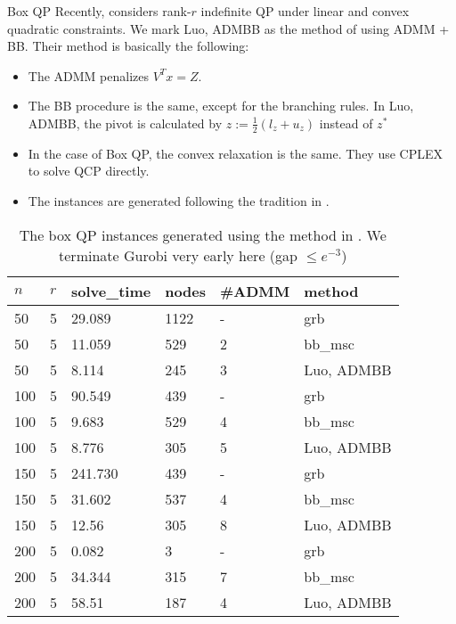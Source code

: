 \documentclass[aspectratio=1610, 9pt]{beamer}
\begin{document}
\setlength\pdfpagewidth{16.00cm}%
\setlength\pdfpageheight{20.00cm}%
\begin{frame}[standout]{Box QP}
  Recently, \cite{luo_new_2019} considers rank-\(r\) indefinite QP under linear and convex quadratic constraints. We mark \textsf{Luo, ADMBB} as the method of using ADMM + BB.  Their method is basically the following:
  \begin{itemize}
    \item The ADMM penalizes \(V^Tx = Z\).
    \item The BB procedure is the same, except for the branching rules. In \textsf{Luo, ADMBB}, the pivot is calculated by \(z := \frac{1}{2}(l_z + u_z)\) instead of \(z^*\)
    \item In the case of Box QP, the convex relaxation is the same. They use CPLEX to solve QCP directly.
    \item The instances are generated following the tradition in \cite{le_an_solving_1997}.
  \end{itemize}


  \small
  \begin{table}[h!]
    \centering
    \begin{tabular}{llllll}
      \toprule
      \(n\) & \(r\) & solve\_time & nodes & \#ADMM & method              \\
      \midrule
      50    & 5     & 29.089      & 1122  & -      & grb                 \\
      50    & 5     & 11.059      & 529   & 2      & bb\_msc             \\
      50    & 5     & 8.114       & 245   & 3      & \textsf{Luo, ADMBB} \\
      100   & 5     & 90.549      & 439   & -      & grb                 \\
      100   & 5     & 9.683       & 529   & 4      & bb\_msc             \\
      100   & 5     & 8.776       & 305   & 5      & \textsf{Luo, ADMBB} \\
      150   & 5     & 241.730     & 439   & -      & grb                 \\
      150   & 5     & 31.602      & 537   & 4      & bb\_msc             \\
      150   & 5     & 12.56       & 305   & 8      & \textsf{Luo, ADMBB} \\
      200   & 5     & 0.082       & 3     & -      & grb                 \\
      200   & 5     & 34.344      & 315   & 7      & bb\_msc             \\
      200   & 5     & 58.51       & 187   & 4      & \textsf{Luo, ADMBB} \\
      \bottomrule
    \end{tabular}
    \caption{The box QP instances generated using the method in \cite{luo_new_2019}.
      We terminate Gurobi very early here (gap \(\le e^{-3}\))}



\end{table}
\end{frame}
\end{document}
